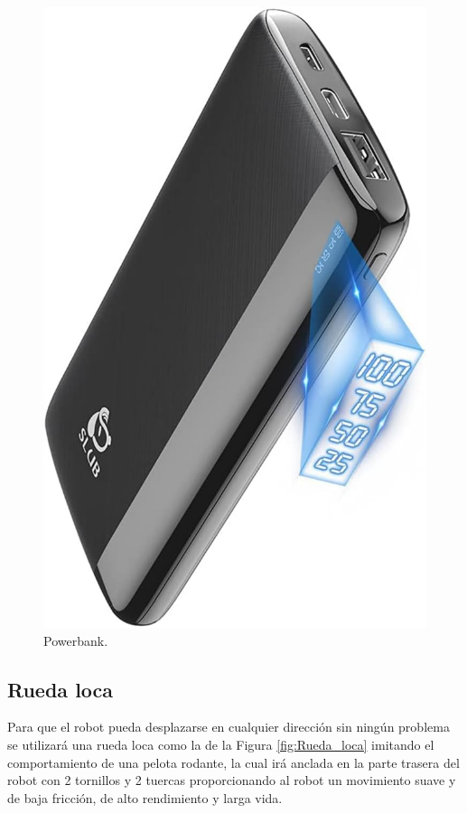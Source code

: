 \begin{figure}[H]
\begin{minipage}{0.48\textwidth}
    \includegraphics[scale=0.13]{figs/powerbank.jpg}
    \caption{Powerbank.} 
    \label{fig:Powerbank}
  \end{minipage}
\end{figure}

\subsection{Rueda loca}
\label{subsec:rueda_loca}

Para que el robot pueda desplazarse en cualquier dirección sin ningún problema se utilizará una rueda loca como la de la Figura \ref{fig:Rueda_loca} imitando el comportamiento de una pelota rodante, la cual irá anclada en la parte trasera del robot con 2 tornillos y 2 tuercas proporcionando al robot un movimiento suave y de baja fricción, de alto rendimiento y larga vida.


